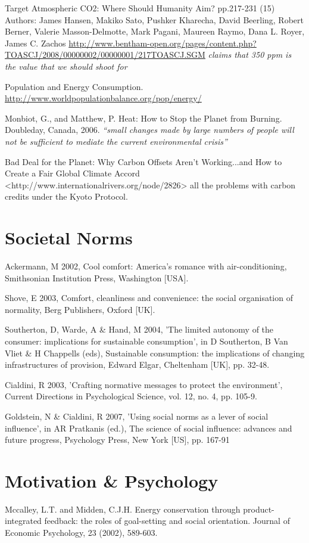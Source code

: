 Target Atmospheric CO2: Where Should Humanity Aim? pp.217-231 (15) Authors: James Hansen, Makiko Sato, Pushker Kharecha, David Beerling, Robert Berner, Valerie Masson-Delmotte, Mark Pagani, Maureen Raymo, Dana L. Royer, James C. Zachos \url{http://www.bentham-open.org/pages/content.php?TOASCJ/2008/00000002/00000001/217TOASCJ.SGM} \emph{claims that 350 ppm is the \COtwo value that we should shoot for}

Population and Energy Consumption. \url{http://www.worldpopulationbalance.org/pop/energy/}

Monbiot, G., and Matthew, P.  Heat: How to Stop the Planet from Burning.  Doubleday, Canada, 2006. \emph{``small changes made by large numbers of people will not be sufficient to mediate the current environmental crisis''}

Bad Deal for the Planet: Why Carbon Offsets Aren't Working...and How to Create a Fair Global Climate Accord <http://www.internationalrivers.org/node/2826> all the problems with carbon credits under the Kyoto Protocol.


\section{Societal Norms}
Ackermann, M 2002, Cool comfort: America's romance with air-conditioning, Smithsonian Institution Press, Washington [USA].

Shove, E 2003, Comfort, cleanliness and convenience: the social organisation of normality, Berg Publishers, Oxford [UK].

Southerton, D, Warde, A \& Hand, M 2004, 'The limited autonomy of the consumer: implications for sustainable consumption', in D Southerton, B Van Vliet \& H Chappells (eds), Sustainable consumption: the implications of changing infrastructures of provision, Edward Elgar, Cheltenham [UK], pp. 32-48.

Cialdini, R 2003, 'Crafting normative messages to protect the environment', Current Directions in Psychological Science, vol. 12, no. 4, pp. 105-9.

Goldstein, N \& Cialdini, R 2007, 'Using social norms as a lever of social influence', in AR Pratkanis (ed.), The science of social influence: advances and future progress, Psychology Press, New York [US], pp. 167-91


\section{Motivation \& Psychology}
Mccalley, L.T. and Midden, C.J.H. Energy conservation through product-integrated feedback: the roles of goal-setting and social orientation. Journal of Economic Psychology, 23 (2002), 589-603.

